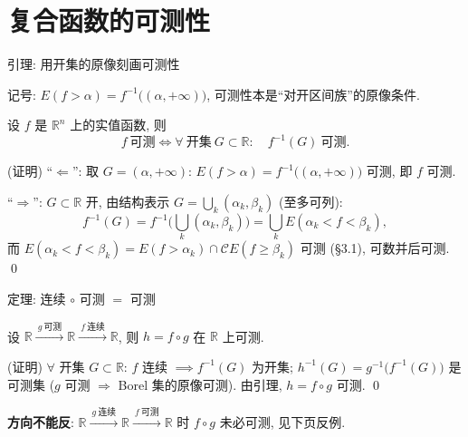 
\section[复合函数]{复合函数的可测性}


\begin{frame}{引理: 用开集的原像刻画可测性}

记号: $E(f > \alpha) = f^{-1}\big((\alpha, +\infty)\big)$, 可测性本是``对开区间族''的原像条件.

\begin{lem}[开集原像刻画]
设 $f$ 是 $\mathbb{R}^n$ 上的实值函数, 则
\[
f\ \text{可测}
\iff
\forall\ \text{开集}\ G \subset \mathbb{R}:\quad f^{-1}(G)\ \text{可测}.
\]
\end{lem}

\startproof[bg=yellow, fg=red](证明)
``$\Longleftarrow$'': 取 $G = (\alpha, +\infty)$: $E(f > \alpha) = f^{-1}\big((\alpha, +\infty)\big)$ 可测,
即 $f$ 可测.

\pause

``$\Longrightarrow$'': $G \subset \mathbb{R}$ 开, 由结构表示 $G = \bigcup_k (\alpha_k, \beta_k)$ (至多可列):
\[
f^{-1}(G) = f^{-1}\Big(\bigcup_k (\alpha_k, \beta_k)\Big)
= \bigcup_k E(\alpha_k < f < \beta_k),
\]
而 $E(\alpha_k < f < \beta_k) = E(f > \alpha_k) \cap \mathscr{C}E(f \geqslant \beta_k)$ 可测 (\S 3.1),
可数并后可测.
\qed

\end{frame}


\begin{frame}{定理: 连续 $\circ$ 可测 $=$ 可测}

\begin{thm}[连续 $\circ$ 可测]
设 $\mathbb{R} \xrightarrow{\ g\ \text{可测}\ } \mathbb{R} \xrightarrow{\ f\ \text{连续}\ } \mathbb{R}$,
则 $h = f \circ g$ 在 $\mathbb{R}$ 上可测.
\end{thm}

\startproof[bg=yellow, fg=red](证明)
$\forall$ 开集 $G \subset \mathbb{R}$: $f$ 连续 $\implies f^{-1}(G)$ 为\alert{开集};
$h^{-1}(G) = g^{-1}\big(f^{-1}(G)\big)$ 是可测集 ($g$ 可测 $\Rightarrow$ Borel 集的原像可测).
由引理, $h = f \circ g$ 可测.
\qed

\pause

\begin{attnblock}
\textbf{方向不能反}: $\mathbb{R} \xrightarrow{\ g\ \text{连续}\ } \mathbb{R}
\xrightarrow{\ f\ \text{可测}\ } \mathbb{R}$ 时 $f \circ g$ \alert{未必可测}, 见下页反例.
\end{attnblock}

\end{frame}

